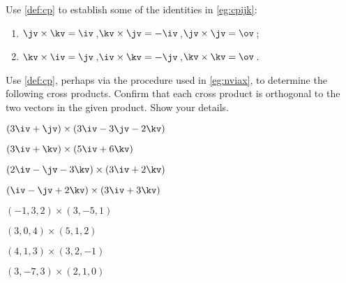 





\sectionExercises


\begin{exercise} \label{ex:cpijk} 
Use \cref{def:cp} to establish some of the  identities in \cref{eg:cpijk}: 
%
\begin{enumerate}
\item \(\jv\times\kv=\iv\)\,,\quad \(\kv\times\jv=-\iv\)\,,\quad \(\jv\times\jv=\ov\)\,;
\item \(\kv\times\iv=\jv\)\,,\quad \(\iv\times\kv=-\jv\)\,,\quad \(\kv\times\kv=\ov\)\,.
\end{enumerate}
\end{exercise}





\begin{exercise}  
Use \cref{def:cp}, perhaps via the procedure used in \cref{eg:nviax}, to determine the following cross products. 
Confirm that each cross product is orthogonal to the two vectors in the given product.
Show your details.
\begin{Parts}
\item \((3\iv+\jv)\times(3\iv -3\jv -2\kv)\)
\answer{\(-2\iv +6\jv -12\kv\)}
\item \((3\iv  +\kv)\times(5\iv +6 \kv)\)
\answer{\(-13\jv\)}
\begin{OmitV1}
\item \((2\iv-\jv -3\kv)\times(3\iv +2\kv)\)
\answer{\(-2\iv -13\jv +3\kv\)}
\item \((\iv -\jv +2\kv)\times(3\iv  +3\kv)\)
\answer{\(-3\iv +3\jv +3\kv\)}
\item \((-1,3,2)\times(3,-5,1)\)
\item \((3,0,4)\times(5,1,2)\)
\end{OmitV1}
\item \((4,1,3)\times(3,2,-1)\)
\item \((3,-7,3)\times(2,1,0)\)
\end{Parts}
\end{exercise}





